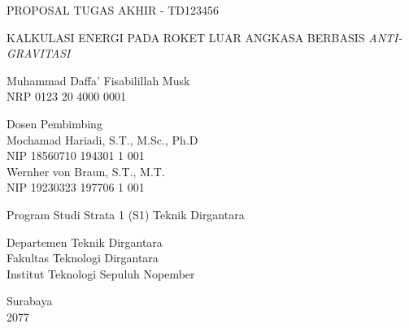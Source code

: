 \begin{large}
  PROPOSAL TUGAS AKHIR - TD123456
\end{large}

\vspace{\fill}

\begin{spacing}{1.5}
  \begin{Large}
    KALKULASI ENERGI PADA ROKET LUAR 
    ANGKASA BERBASIS \emph{ANTI-GRAVITASI}
  \end{Large}
\end{spacing}

\vspace{\fill}

\begin{large}
  Muhammad Daffa' Fisabilillah Musk \\
  \textmd{NRP 0123 20 4000 0001}
\end{large}

\vspace{\fill}

\begin{large}
  \textmd{Dosen Pembimbing} \\
  Mochamad Hariadi, S.T., M.Sc., Ph.D \\
  \textmd{NIP 18560710 194301 1 001} \\
  Wernher von Braun, S.T., M.T. \\
  \textmd{NIP 19230323 197706 1 001}
\end{large}

\vspace{\fill}

Program Studi Strata 1 (S1) Teknik Dirgantara \\

\mdseries

Departemen Teknik Dirgantara \\
Fakultas Teknologi Dirgantara \\
Institut Teknologi Sepuluh Nopember

Surabaya \\
2077
